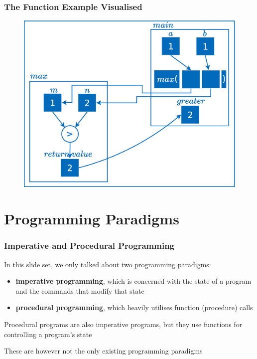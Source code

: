 \documentclass{beamer}
\begin{document}
\begin{frame}
\frametitle{The Function Example Visualised}
    \begin{figure}[H]
        \centering
        \includegraphics[scale=0.25]{figures/max_function_example.eps}
    \end{figure}
\end{frame}

\section{Programming Paradigms}

\begin{frame}
\frametitle{Imperative and Procedural Programming}
    In this slide set, we only talked about two programming paradigms:
    \begin{itemize}
        \item \textbf{imperative programming}, which is concerned with the state of a program and the commands that modify that state
        \item \textbf{procedural programming}, which heavily utilises function (procedure) calls
        \newline
    \end{itemize}

    Procedural programs are also imperative programs, but they use functions for controlling a program's state
    \newline

    These are however not the only existing programming paradigms
\end{frame}
\end{document}
